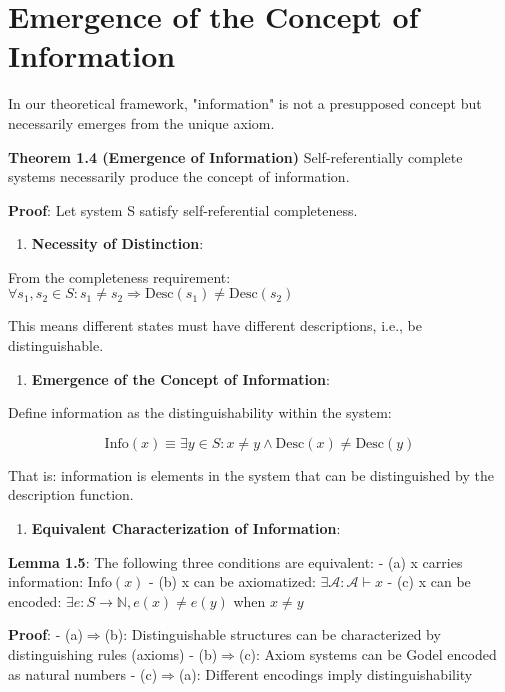 \section{Emergence of the Concept of Information}
\label{sec:ch01_axiom_and_derivation:emergence-of-the-concept-of-information}

In our theoretical framework, "information" is not a presupposed concept but necessarily emerges from the unique axiom.

\textbf{Theorem 1.4 (Emergence of Information)}
\label{thm:1.4}
Self-referentially complete systems necessarily produce the concept of information.

\textbf{Proof}:
Let system S satisfy self-referential completeness.

\begin{enumerate}
\item \textbf{Necessity of Distinction}:
\end{enumerate}
  From the completeness requirement: $\forall s_1, s_2 \in S: s_1 \neq s_2 \Rightarrow \text{Desc}(s_1) \neq \text{Desc}(s_2)$
  
  This means different states must have different descriptions, i.e., be distinguishable.

\begin{enumerate}
\item \textbf{Emergence of the Concept of Information}:
\end{enumerate}
  Define information as the distinguishability within the system:
  
\begin{equation}
\text{Info}(x) \equiv \exists y \in S: x \neq y \land \text{Desc}(x) \neq \text{Desc}(y)
\end{equation}
  
  That is: information is elements in the system that can be distinguished by the description function.
\begin{enumerate}
\item \textbf{Equivalent Characterization of Information}:
\end{enumerate}
  
  \textbf{Lemma 1.5}: The following three conditions are equivalent:
\label{lem:1.5}
  - (a) x carries information: $\text{Info}(x)$
  - (b) x can be axiomatized: $\exists \mathcal{A}: \mathcal{A} \vdash x$
  - (c) x can be encoded: $\exists e: S \to \mathbb{N}, e(x) \neq e(y)$ when $x \neq y$
  
  \textbf{Proof}:
  - (a)$\Rightarrow$(b): Distinguishable structures can be characterized by distinguishing rules (axioms)
  - (b)$\Rightarrow$(c): Axiom systems can be Godel encoded as natural numbers
  - (c)$\Rightarrow$(a): Different encodings imply distinguishability

